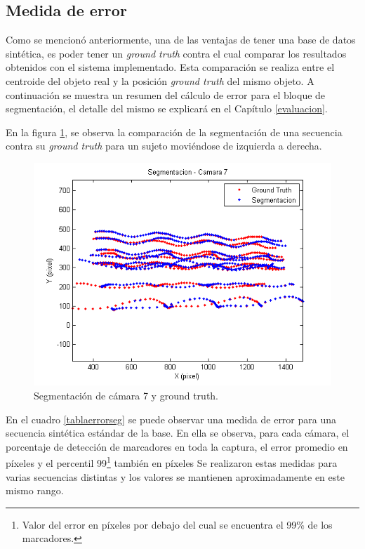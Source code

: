\subsection{Medida de error}

Como se mencionó anteriormente, una de las ventajas de tener una base de datos sintética, es poder tener un \textit{ground truth} contra el cual comparar los resultados obtenidos con el sistema implementado. Esta comparación se realiza entre el centroide del objeto real y la posición \textit{ground truth} del mismo objeto. A continuación se muestra un resumen del cálculo de error para el bloque de segmentación, el detalle del mismo se explicará en el Capítulo \ref{evaluacion}. 

En la figura \ref{ejMedErr}, se observa la comparación de la segmentación de una secuencia contra su \textit{ground truth} para un sujeto moviéndose de izquierda a derecha.

\vspace{-3mm}

\begin{figure}[ht!]
\begin{center}
\includegraphics[scale=0.6]{img/imagen_segmentacion_cam7_8_07_100_200.png}
\end{center}
\vspace{-7mm}
\caption{Segmentación de cámara 7 y ground truth.}
\label{ejMedErr}
\end{figure}

En el cuadro \ref{tablaerrorseg} se puede observar una medida de error para una secuencia sintética estándar de la base. En ella se observa, para cada cámara, el porcentaje de detección de marcadores en toda la captura, el error promedio en píxeles y el percentil 99\footnote{Valor del error en píxeles por debajo del cual se encuentra el 99\% de los marcadores.} también en píxeles Se realizaron estas medidas para varias secuencias distintas y los valores se mantienen aproximadamente en este mismo rango.

